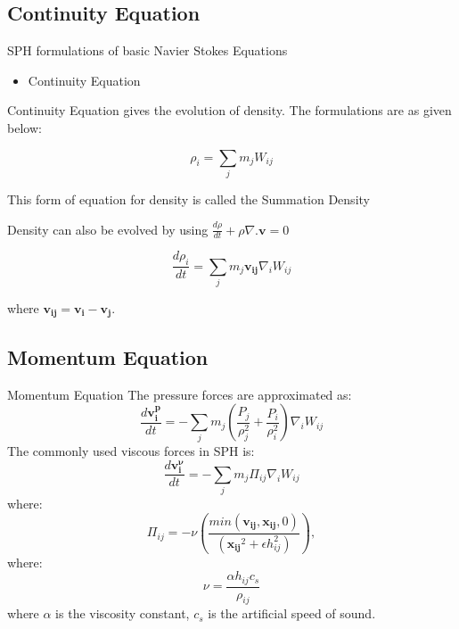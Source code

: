 \documentclass{beamer}
\begin{document}
\subsection{Continuity Equation}
\begin{frame}{SPH formulations of basic Navier Stokes Equations}
\begin{itemize}
\item Continuity Equation
\end{itemize}
Continuity Equation gives the evolution of density. The formulations
are as given below:

\begin{equation}
 \rho_i = \sum_j m_j W_{ij}
 \label{summation}
\end{equation}

This form of equation for density is called the Summation Density

\noindent
Density can also be evolved by using $\frac{d\rho}{dt} + \rho \nabla . \mathbf{v} = 0$

\begin{equation}
 \frac{d\rho_i}{dt} = \sum_j m_j \mathbf{v_{ij}} \nabla_i W_{ij}
  \label{Continuity}
 \end{equation}

where $\mathbf{v_{ij}} = \mathbf{v_i} - \mathbf{v_j}$.\\
\end{frame}

\subsection{Momentum Equation}
\begin{frame}{Momentum Equation}
The pressure forces are approximated as:
\begin{equation*}
 \frac{d\mathbf{v_i^p}}{dt} = -\sum_j m_j \left( \frac{P_j}{\rho_j^2} + \frac{P_i}{\rho_i^2}\right)\nabla_i W_{ij}
\end{equation*}
The commonly used viscous forces in SPH is:
\begin{equation*}
 \frac{d\mathbf{v_i^\nu}}{dt} = - \sum_j m_j \Pi_{ij} \nabla_i W_{ij}
\end{equation*}
where:
\begin{equation*}
 \Pi_{ij} = -\nu \left( \frac{min(\mathbf{v_{ij}}, \mathbf{x_{ij}}, 0)}{(\mathbf{x_{ij}}^2 + \epsilon h_{ij}^2)}\right), 
  \label{pi}
 \end{equation*}
where:
\begin{equation*}
 \nu = \frac{\alpha h_{ij}c_s}{\rho_{ij}}
\end{equation*}
where $\alpha$ is the viscosity constant, $c_s$ is the artificial speed of sound.
\end{frame}
\end{document}
